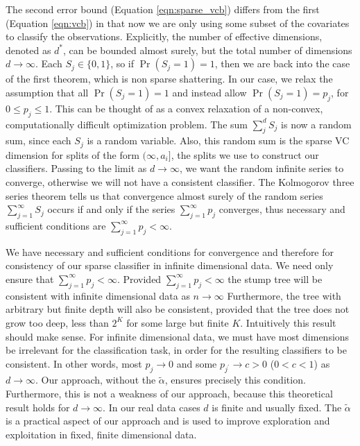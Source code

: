 The second error bound (Equation \ref{eqn:sparse_vcb}) differs from the first (Equation \ref{eqn:vcb}) in that now we are only using some subset of the covariates to classify the observations. Explicitly, the number of effective dimensions, denoted as $d^*$, can be bounded almost surely, but the total number of dimensions $d\to\infty$. Each $S_j \in \{0,1\}$, so if $\Pr(S_j=1)=1$, then we are back into the case of the first theorem, which is non sparse shattering. In our case, we relax the assumption that all $\Pr(S_j=1)=1$ and instead allow $\Pr(S_j=1)=p_j$, for $0\leq p_j\leq 1$. This can be thought of as a convex relaxation of a non-convex, computationally difficult optimization problem. The sum $\sum_j^dS_j$ is now a random sum, since each $S_j$ is a random variable. Also, this random sum is the sparse VC dimension for splits of the form $(\infty, a_i]$, the splits we use to construct our classifiers. Passing to the limit as $d\to \infty$, we want the random infinite series to converge, otherwise we will not have a consistent classifier. The Kolmogorov three series theorem tells us that convergence almost surely of the random series $\sum_{j=1}^\infty S_j$ occurs if and only if the series $\sum_{j=1}^\infty p_j$ converges, thus necessary and sufficient conditions are $\sum_{j=1}^\infty p_j < \infty$. 

We have necessary and sufficient conditions for convergence and therefore for consistency of our sparse classifier in infinite dimensional data. We need only ensure that $\sum_{j=1}^\infty p_j < \infty$. Provided $\sum_{j=1}^\infty p_j <\infty$ the stump tree will be consistent with infinite dimensional data as $n\to\infty$ Furthermore, the tree with arbitrary but finite depth will also be consistent, provided that the tree does not grow too deep, less than $2^K$ for some large but finite $K$. Intuitively this result should make sense. For infinite dimensional data, we must have most dimensions be irrelevant for the classification task, in order for the resulting classifiers to be consistent. In other words, most $p_j \to 0$ and some $p_{j^\prime}\to c >0$ ($0<c<1$) as $d\to\infty$. Our approach, without the $\widetilde{\alpha}$, ensures precisely this condition. Furthermore, this is not a weakness of our approach, because this theoretical result holds for $d\to\infty$. In our real data cases $d$ is finite and usually fixed. The $\widetilde{\alpha}$ is a practical aspect of our approach and is used to improve exploration and exploitation in fixed, finite dimensional data. 

